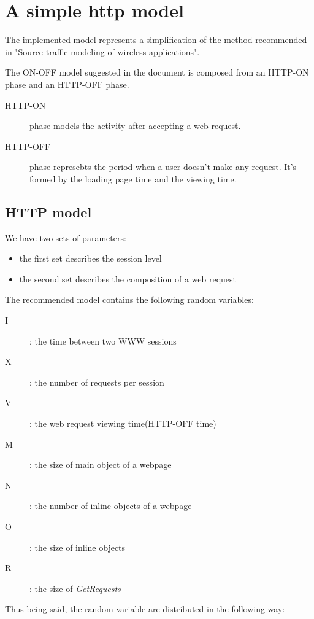 %
\section{A simple http model}

 The implemented model represents a simplification of the method recommended in "Source traffic modeling of wireless applications".

The ON-OFF model suggested in the document is composed from an HTTP-ON phase and an HTTP-OFF phase.
\begin{description}
 \item[HTTP-ON] phase models the activity after accepting a web request.
 \item[HTTP-OFF] phase represebts the period when a user doesn't make any request. It's formed by the loading page time and the viewing time.
\end{description}

\subsection{HTTP model}

We have two sets of parameters:
\begin{itemize}
 \item the first set describes the session level
 \item the second set describes the composition of a web request
\end{itemize}

The recommended model contains the following random variables:

\begin{description}
 \item[I]: the time between two WWW sessions
 \item[X]: the number of requests per session
 \item[V]: the web request viewing time(HTTP-OFF time)
 \item[M]: the size of main object of a webpage
 \item[N]: the number of inline objects of a webpage
 \item[O]: the size of inline objects
 \item[R]: the size of \textit{GetRequests}

\end{description}
Thus being said, the random variable are distributed in the following way:

